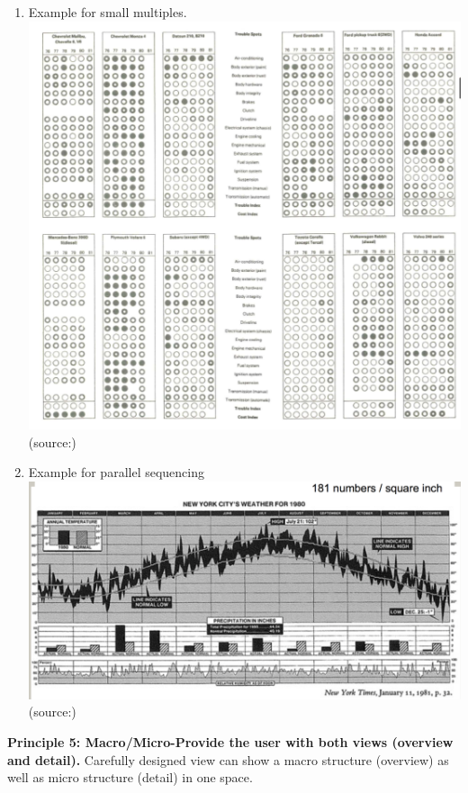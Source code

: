 \documentclass[]{book}
\theoremstyle{definition}
\theoremstyle{definition}
\theoremstyle{definition}
\theoremstyle{remark}
\begin{document}
\begin{enumerate}
\def\labelenumi{\arabic{enumi}.}
\item
  Example for small multiples.
  \includegraphics{images/Tufte_figure8.png} (source:\citep{Tufte_2001})
\item
  Example for parallel sequencing
  \includegraphics{images/Tufte_figure7.png} (source:\citep{Tufte_2001})
\end{enumerate}

\textbf{Principle 5: Macro/Micro-Provide the user with both views
(overview and detail).} Carefully designed view can show a macro
structure (overview) as well as micro structure (detail) in one space.
\end{document}
